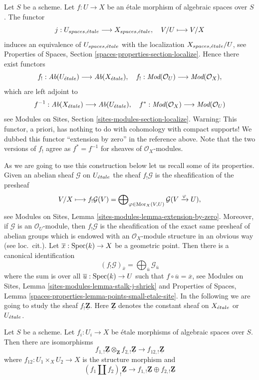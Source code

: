 \noindent
Let $S$ be a scheme. Let $f : U \to X$ be an \'etale morphism of algebraic
spaces over $S$. The functor
$$
j : U_{spaces, {\acute{e}tale}} \longrightarrow X_{spaces, {\acute{e}tale}},\quad
V/U \longmapsto V/X
$$
induces an equivalence of $U_{spaces, {\acute{e}tale}}$ with the localization
$X_{spaces, {\acute{e}tale}}/U$, see
Properties of Spaces, Section \ref{spaces-properties-section-localize}.
Hence there exist functors
$$
f_! : \textit{Ab}(U_{\acute{e}tale}) \longrightarrow
\textit{Ab}(X_{\acute{e}tale}),\quad
f_! : \textit{Mod}(\mathcal{O}_U) \longrightarrow \textit{Mod}(\mathcal{O}_X),
$$
which are left adjoint to
$$
f^{-1} : \textit{Ab}(X_{\acute{e}tale}) \longrightarrow
\textit{Ab}(U_{\acute{e}tale}),\quad
f^* : \textit{Mod}(\mathcal{O}_X) \longrightarrow \textit{Mod}(\mathcal{O}_U)
$$
see
Modules on Sites, Section \ref{sites-modules-section-localize}.
Warning: This functor, a priori, has
nothing to do with cohomology with compact supports!
We dubbed this functor ``extension by zero'' in the reference above.
Note that the two versions of $f_!$ agree as $f^* = f^{-1}$ for
sheaves of $\mathcal{O}_X$-modules.

\medskip\noindent
As we are going to use this construction below let us recall some of its
properties. Given an abelian sheaf $\mathcal{G}$ on $U_{\acute{e}tale}$
the sheaf $f_!\mathcal{G}$ is the sheafification of the presheaf
$$
V/X \longmapsto
f_!\mathcal{G}(V) =
\bigoplus\nolimits_{\varphi \in \mathop{\mathrm{Mor}}\nolimits_X(V, U)}
\mathcal{G}(V \xrightarrow{\varphi} U),
$$
see
Modules on Sites, Lemma \ref{sites-modules-lemma-extension-by-zero}.
Moreover, if $\mathcal{G}$ is an $\mathcal{O}_U$-module, then $f_!\mathcal{G}$
is the sheafification of the exact same presheaf of abelian groups which
is endowed with an $\mathcal{O}_X$-module structure in an obvious way
(see loc.\ cit.). Let $\overline{x} : \mathop{\mathrm{Spec}}(k) \to X$
be a geometric point. Then there is a canonical identification
$$
(f_!\mathcal{G})_{\overline{x}} =
\bigoplus\nolimits_{\overline{u}} \mathcal{G}_{\overline{u}}
$$
where the sum is over all $\overline{u} : \mathop{\mathrm{Spec}}(k) \to U$ such that
$f \circ \overline{u} = \overline{x}$, see
Modules on Sites, Lemma \ref{sites-modules-lemma-stalk-j-shriek}
and
Properties of Spaces, Lemma
\ref{spaces-properties-lemma-points-small-etale-site}.
In the following we are going to study the sheaf $f_!\underline{\mathbf{Z}}$.
Here $\underline{\mathbf{Z}}$ denotes the constant sheaf on
$X_{\acute{e}tale}$ or $U_{\acute{e}tale}$.

\begin{lemma}
\label{lemma-product-is-tensor-product}
Let $S$ be a scheme. Let $f_i : U_i \to X$ be \'etale morphisms
of algebraic spaces over $S$. Then there are isomorphisms
$$
f_{1, !}\underline{\mathbf{Z}} \otimes_{\mathbf{Z}}
f_{2, !}\underline{\mathbf{Z}}
\longrightarrow
f_{12, !}\underline{\mathbf{Z}}
$$
where $f_{12} : U_1 \times_X U_2 \to X$ is the structure morphism
and
$$
(f_1 \amalg f_2)_! \underline{\mathbf{Z}}
\longrightarrow
f_{1, !}\underline{\mathbf{Z}} \oplus
f_{2, !}\underline{\mathbf{Z}}
$$
\end{lemma}

